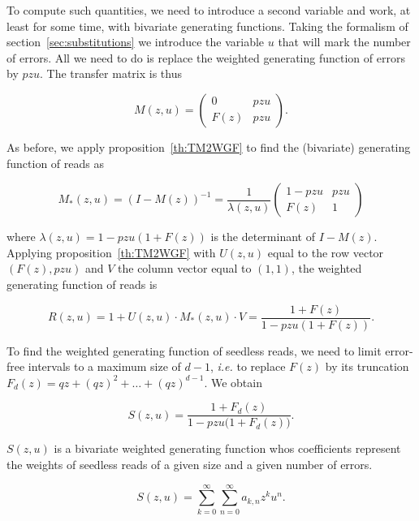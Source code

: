 \documentclass{article}
\begin{document}
To compute such quantities, we need to introduce a second variable and
work, at least for some time, with bivariate generating functions. Taking
the formalism of section~\ref{sec:substitutions} we introduce the variable
$u$ that will mark the number of errors. All we need to do is replace the
weighted generating function of errors by $pzu$. The transfer matrix
is thus

\begin{equation*}
M(z,u) = \left(
\begin{matrix}
0    & pzu \\
F(z) & pzu
\end{matrix}
\right).
\end{equation*}

As before, we apply proposition~\ref{th:TM2WGF} to find the (bivariate)
generating function of reads as

\begin{equation*}
M_*(z,u) = (I-M(z))^{-1}=
\frac{1}{\lambda(z,u)}
\left(
\begin{matrix}
1-pzu & pzu   \\
F(z) & 1
\end{matrix}
\right)
\end{equation*}

\noindent
where $\lambda(z,u) = 1-pzu(1+F(z))$ is the determinant of $I-M(z)$.
Applying proposition~\ref{th:TM2WGF} with $U(z,u)$ equal to the row vector
$(F(z), pzu)$ and $V$ the column vector equal to $(1,1)$, the weighted
generating function of reads is

\begin{equation*}
R(z,u) = 1 + U(z,u) \cdot M_*(z,u) \cdot V = 
\frac{1+F(z)}{1-pzu(1+F(z))}.
\end{equation*}

To find the weighted generating function of seedless reads, we need to
limit error-free intervals to a maximum size of $d-1$, \textit{i.e.} to
replace $F(z)$ by its truncation $F_d(z) = qz + (qz)^2 + \ldots
+ (qz)^{d-1}$. We obtain

\begin{equation}
\label{eq:Szu}
S(z,u) = \frac{1+F_d(z)}{1-pzu\big( 1+F_d(z) \big)}.
\end{equation}

$S(z,u)$ is a bivariate weighted generating function whos coefficients
represent the weights of seedless reads of a given size and a given number
of errors.

\begin{equation*}
S(z,u) = \sum_{k=0}^\infty\sum_{n=0}^\infty a_{k,n}z^ku^n.
\end{equation*}
\end{document}
